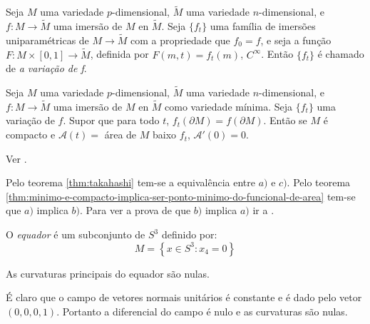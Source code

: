 \begin{definicao}
	Seja $M$ uma variedade $p$-dimensional, $\tilde{M}$ uma variedade $n$-dimensional, e $f: M \rightarrow \tilde{M}$ uma imersão de $M$ en $\tilde{M}$.
	Seja $\{ f_t \}$ uma família de imersões uniparamétricas de $M \rightarrow \tilde{M}$ com a propriedade que $f_0 = f$, e seja a função $F: M \times [0,1] \rightarrow \tilde{M}$, definida por $F(m,t) = f_t(m)$, $C^{\infty}$. Então $\{ f_t \}$ é chamado de \emph{a variação de f}.
\end{definicao}

\begin{teorema}\label{thm:minimo-e-compacto-implica-ser-ponto-minimo-do-funcional-de-area}
	Seja $M$ uma variedade $p$-dimensional, $\tilde{M}$ uma variedade $n$-dimensional, e $f: M \rightarrow \tilde{M}$ uma imersão de $M$ en $\tilde{M}$ como variedade mínima.
	Seja $\{ f_t \}$ uma variação de $f$. Supor que para todo $t$, $ f_t(\partial M) = f(\partial M) $. Então se $M$ é compacto e $\mathcal{A}(t) =$ área de $M$ baixo $f_t$, $\mathcal{A}'(0)=0$.
\end{teorema}

\begin{demonstracao}
	Ver \cite[Theorem 3.2.1]{Simons1968}.
\end{demonstracao}



\begin{demonstracao}
	Pelo teorema \ref{thm:takahashi} tem-se a equivalência entre $a)$ e $c)$. Pelo teorema \ref{thm:minimo-e-compacto-implica-ser-ponto-minimo-do-funcional-de-area} tem-se que $a)$ implica $b)$. Para ver a prova de que $b)$ implica $a)$ ir a \cite[\S 2.4]{Simons1968}.
\end{demonstracao}

\begin{definicao}
	O \emph{equador} é um subconjunto de $S^3$ definido por:
	\begin{equation}
	M = \left\{ x \in S^3: x_4 = 0 \right\}
	\end{equation}
\end{definicao}

\begin{proposicao}
	As curvaturas principais do equador são nulas.
\end{proposicao}

\begin{demonstracao}
	É claro que o campo de vetores normais unitários é constante e é dado pelo vetor $(0,0,0,1)$. Portanto a diferencial do campo é nulo e as curvaturas são nulas.
\end{demonstracao}

